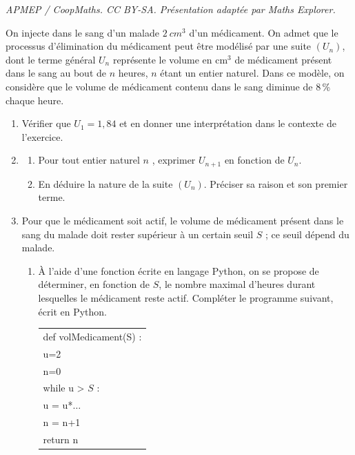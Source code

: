 \documentclass[10pt]{article}
\providecommand{\np}[2][]{{#2~#1}}
\begin{document}
\noindent\textit{APMEP / CoopMaths. CC BY-SA. Présentation adaptée par Maths Explorer.}\par\medskip
\medskip

On injecte dans le sang d'un malade $\np[cm^3]{2}$  d'un médicament. On admet que le processus
d'élimination du médicament peut être modélisé par une suite $\left(U_n\right)$, dont le terme général $U_n$ représente le volume en cm$^3$ de médicament présent dans le sang au bout de $n$ heures,
$n$ étant un entier naturel. Dans ce modèle, on considère que le volume de médicament
contenu dans le sang diminue de 8\,\% chaque heure.

\medskip

\begin{enumerate}
\item Vérifier que $U_1 = 1,84$ et en donner une interprétation dans le contexte de l'exercice.
\item 
	\begin{enumerate}
		\item Pour tout entier naturel $n$ , exprimer $U_{n+1}$ en fonction de $U_n$.

		\item En déduire la nature de la suite $\left(U_n\right)$. Préciser sa raison et son premier terme.

	\end{enumerate}
\item Pour que le médicament soit actif, le volume de médicament présent dans le sang du malade doit rester supérieur à un certain seuil $S$ ; ce seuil dépend du malade.
	\begin{enumerate}
		\item À l'aide d'une fonction écrite en langage Python, on se propose de déterminer, en fonction de $S$, le nombre maximal d'heures durant lesquelles le médicament reste actif.
Compléter le programme suivant, écrit en Python.

\begin{center}
\begin{tabular}{|l|}
\hline
def volMedicament(S) :\\
\hspace{2em}u=2\\
\hspace{2em}n=0\\
\hspace{2em}while u > $S$ :\\
\hspace{2em}	u = u*$\dots$\\
\hspace{2em}	n = n+1\\
return n\\\hline
\end{tabular}
\end{center}


\end{enumerate}
\end{enumerate}
\end{document}
